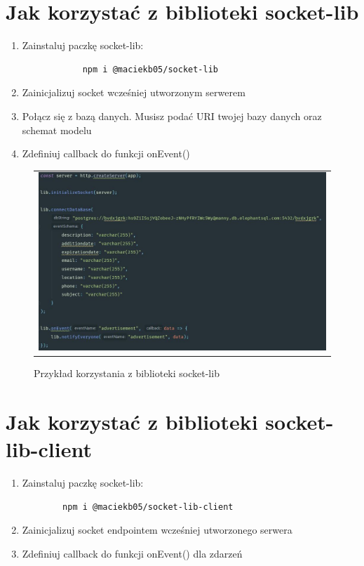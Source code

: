 \documentclass{sprawozdanie-agh}
\begin{document}
	
	\section{Jak korzystać z biblioteki socket-lib}
	\begin{enumerate}
		\item Zainstaluj paczkę socket-lib:
		\begin{lstlisting}
			npm i @maciekb05/socket-lib
		\end{lstlisting}
		\item Zainicjalizuj socket wcześniej utworzonym serwerem
		\item Połącz się z bazą danych. Musisz podać
		URI twojej bazy danych oraz schemat modelu 
		\item Zdefiniuj callback do funkcji onEvent()
	\end{enumerate}

	\begin{figure}[H] 
		\centering
		\begin{tabular}{c}
			\includegraphics[width=.99\textwidth]{socket-lib}
		\end{tabular} 
		\caption{Przykład korzystania z biblioteki socket-lib}
	\end{figure}

	\section{Jak korzystać z biblioteki socket-lib-client}
	\begin{enumerate}
		\item Zainstaluj paczkę socket-lib:
		\begin{lstlisting}
		npm i @maciekb05/socket-lib-client
		\end{lstlisting}
		\item Zainicjalizuj socket endpointem wcześniej utworzonego serwera
		\item Zdefiniuj callback do funkcji onEvent() dla zdarzeń
	\end{enumerate}
\end{document}
